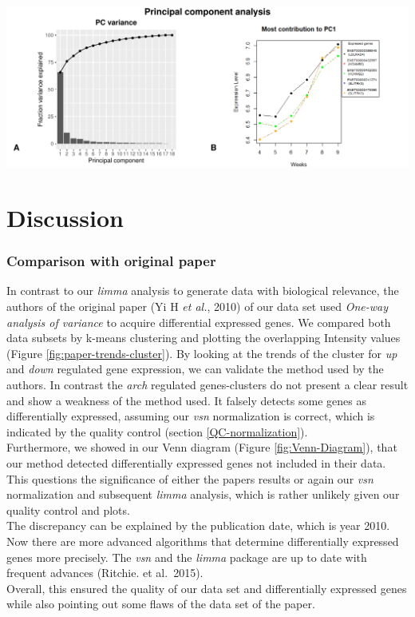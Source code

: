 \documentclass[
]{article}
\begin{document}
\includegraphics{final_report_files/figure-latex/PCA-analysis-1.pdf}

\hypertarget{discussion}{%
\section{Discussion}\label{discussion}}

\hypertarget{comparison-with-original-paper}{%
\subsubsection{Comparison with original paper}\label{comparison-with-original-paper}}

In contrast to our \emph{limma} analysis to generate data with biological relevance, the authors of the original paper (Yi H \emph{et al.}, 2010) of our data set used \emph{One-way analysis of variance} to acquire differential expressed genes. We compared both data subsets by k-means clustering and plotting the overlapping Intensity values (Figure \ref{fig:paper-trends-cluster}). By looking at the trends of the cluster for \emph{up} and \emph{down} regulated gene expression, we can validate the method used by the authors. In contrast the \emph{arch} regulated genes-clusters do not present a clear result and show a weakness of the method used. It falsely detects some genes as differentially expressed, assuming our \emph{vsn} normalization is correct, which is indicated by the quality control (section \ref{QC-normalization}).\\
Furthermore, we showed in our Venn diagram (Figure \ref{fig:Venn-Diagram}), that our method detected differentially expressed genes not included in their data. This questions the significance of either the papers results or again our \emph{vsn} normalization and subsequent \emph{limma} analysis, which is rather unlikely given our quality control and plots.\\
The discrepancy can be explained by the publication date, which is year 2010. Now there are more advanced algorithms that determine differentially expressed genes more precisely. The \emph{vsn} and the \emph{limma} package are up to date with frequent advances (Ritchie. et al.~2015).\\
Overall, this ensured the quality of our data set and differentially expressed genes while also pointing out some flaws of the data set of the paper.
\end{document}
